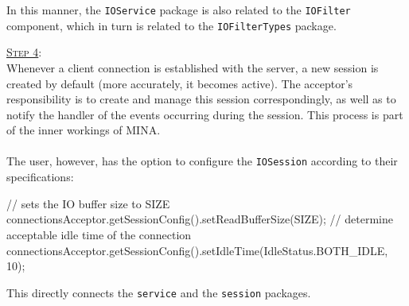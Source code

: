 In this manner, the \texttt{IOService} package is also related to the \texttt{IOFilter} component, which in turn is related to the \texttt{IOFilterTypes} package.

\underline{\textsc{Step 4}}:\\
Whenever a client connection is established with the server, a new session is created by default (more accurately, it becomes active). The acceptor's responsibility is to create and manage this session correspondingly, as well as to notify the handler of the events occurring during the session. This process is part of the inner workings of MINA.\\\\
The user, however, has the option to configure the \texttt{IOSession} according to their specifications:

\begin{javashort}
// sets the IO buffer size to SIZE
connectionsAcceptor.getSessionConfig().setReadBufferSize(SIZE);
// determine acceptable idle time of the connection
connectionsAcceptor.getSessionConfig().setIdleTime(IdleStatus.BOTH_IDLE, 10);
\end{javashort}

This directly connects the \texttt{service} and the \texttt{session} packages.





